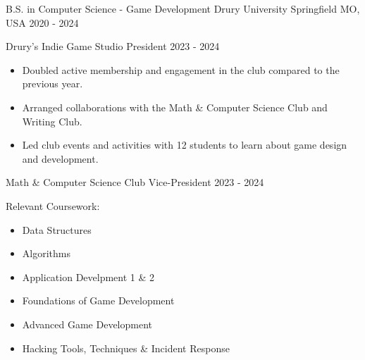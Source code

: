 

\begin{cventries}

  \cventry
    {B.S. in Computer Science - Game Development} %
    {Drury University} %
    {Springfield MO, USA} %
    {2020 - 2024} %
    {
      \begin{cvitems} %
        \item {Drury's Indie Game Studio President 2023 - 2024}
            \newline
            \begin{itemize}
                \item {Doubled active membership and engagement in the club compared to the previous year.}
                \item {Arranged collaborations with the Math \& Computer Science Club and Writing Club.}
                \item {Led club events and activities with 12 students to learn about game design and development.}
            \end{itemize}
        \item {Math \& Computer Science Club Vice-President 2023 - 2024}
	\item {Relevant Coursework:}
		\newline
		\begin{itemize}
			\item {Data Structures}
			\item {Algorithms}
			\item {Application Develpment 1 \& 2}
			\item {Foundations of Game Development}
			\item {Advanced Game Development}
			\item {Hacking Tools, Techniques \& Incident Response}
		\end{itemize}
      \end{cvitems}
    }

\end{cventries}
